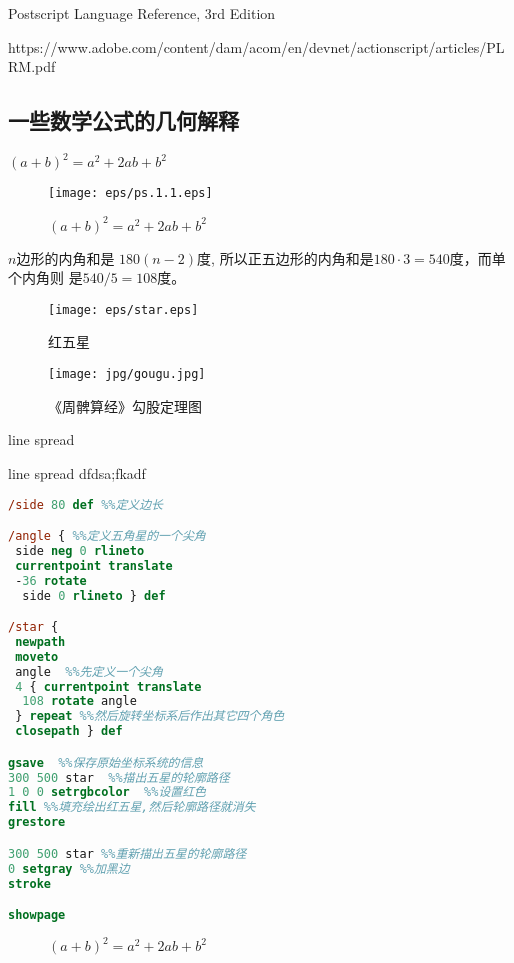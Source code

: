 \documentclass[main.tex]{subfiles}
\begin{document}
	Postscript Language Reference, 3rd Edition \cite{PSLF3}
	
	https://www.adobe.com/content/dam/acom/en/devnet/actionscript/articles/PLRM.pdf
	



	
	
	
\subsection{一些数学公式的几何解释}
$(a+b)^2 = a^2 + 2ab + b^2$


\begin{figure}[h]
    \centering
    \texttt{[image: eps/ps.1.1.eps]}
    \caption{$(a+b)^2 = a^2 + 2ab + b^2$}
    \label{fig:III.1.1}
\end{figure}

\begin{example} $n$边形的内角和是 $180(n-2)$度, 所以正五边形的内角和是$180\cdot 3 = 540$度，而单个内角则 是$540/5 = 108$度。
\end{example}

\begin{figure}[h]
	\centering
	\texttt{[image: eps/star.eps]}
	\caption{红五星}
	\label{fig:III.1.2}
\end{figure}

\begin{figure}[h]
	\centering
	\texttt{[image: jpg/gougu.jpg]}
	\caption{《周髀算经》勾股定理图}
	\label{fig:III.1.3}
\end{figure}

\iffalse
\begin{figure}[h]
	\centering
	
	\caption{圆盘}
	\label{fig:III.1.3}
\end{figure}
\fi

line spread

line spread
dfdsa;fkadf

\begin{spacing}{0.8}
\begin{lstlisting}[language=PostScript]
%!PS-Adobe-3.0
/side 80 def %%定义边长 

/angle { %%定义五角星的一个尖角
 side neg 0 rlineto
 currentpoint translate
 -36 rotate
  side 0 rlineto } def

/star {
 newpath
 moveto
 angle  %%先定义一个尖角
 4 { currentpoint translate
  108 rotate angle 
 } repeat %%然后旋转坐标系后作出其它四个角色
 closepath } def

gsave  %%保存原始坐标系统的信息
300 500 star  %%描出五星的轮廓路径
1 0 0 setrgbcolor  %%设置红色
fill %%填充绘出红五星,然后轮廓路径就消失
grestore

300 500 star %%重新描出五星的轮廓路径
0 setgray %%加黑边
stroke

showpage
\end{lstlisting}
\end{spacing}
\begin{figure}[h]
	\centering
	\caption{$(a+b)^2 = a^2 + 2ab + b^2$}
	\label{fig:III.1.3}
\end{figure}
\end{document}
